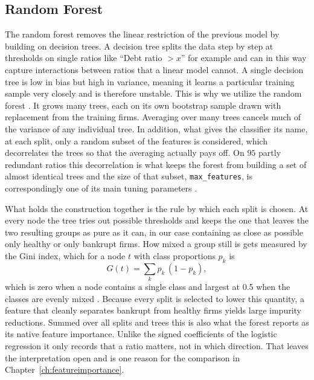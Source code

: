 \subsection{Random Forest}
\label{sec:rf}

The random forest removes the linear restriction of the previous model by building
on decision trees. A decision tree splits the data step by step at thresholds on single
ratios like ``Debt ratio $> x$'' for example and can in this way capture
interactions between ratios that a linear model cannot. A
single decision tree is low in bias but high in variance, meaning it learns a
particular training sample very closely and is therefore unstable. This is why we utilize
the random forest \parencite{breiman2001}. It grows many trees, each on its own bootstrap
sample drawn with replacement from the training firms.
Averaging over many trees cancels much of the variance of any individual tree. In addition,
what gives the classifier its name, at each split, only a random subset of the features is
considered, which decorrelates the trees so that the averaging actually pays off. On $95$ partly
redundant ratios this decorrelation is what keeps the forest from building a
set of almost identical trees and the size of that subset, \texttt{max\_features},
is correspondingly one of its main tuning parameters \parencite{probst2019}.

What holds the construction together is the rule by which each split is chosen. At
every node the tree tries out possible thresholds and keeps the one that leaves the
two resulting groups as pure as it can, in our case containing as close as possible
only healthy or only bankrupt firms. How mixed a group still is gets measured by the
Gini index, which for a node $t$ with class proportions $p_k$ is
\begin{equation}
  G(t) = \sum_{k} p_k\,(1 - p_k) ,
  \label{eq:gini}
\end{equation}
which is zero when a node contains a single class and largest at 0.5 when the classes are
evenly mixed \parencite[331]{islp2023}. Because every split is selected to
lower this quantity, a feature that cleanly separates bankrupt from healthy firms
yields large impurity reductions. Summed over all splits and trees this is also what
the forest reports as its native feature importance. Unlike the signed coefficients
of the logistic regression it only records that a ratio matters, not in which
direction. That leaves the interpretation open and is one reason
for the comparison in Chapter~\ref{ch:featureimportance}.

